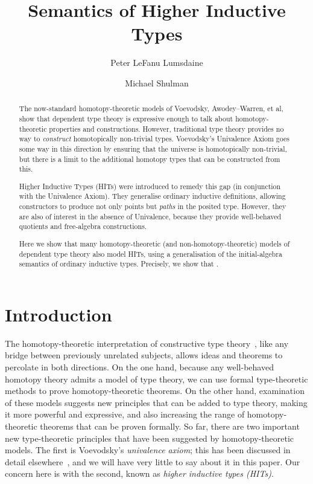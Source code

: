 \documentclass{amsart}
\title{Semantics of Higher Inductive Types}
\author{Peter LeFanu Lumsdaine}
\author{Michael Shulman}
\begin{document}
\maketitle

\begin{abstract}
The now-standard homotopy-theoretic models of Voevodsky, Awodey--Warren, et al, show that dependent type theory is expressive enough to talk about homotopy-theoretic properties and constructions.
%
However, traditional type theory provides no way to \emph{construct} homotopically non-trivial types.
Voevodsky's Univalence Axiom goes some way in this direction by ensuring that the universe is homotopically non-trivial, but there is a limit to the additional homotopy types that can be constructed from this.

Higher Inductive Types (HITs) were introduced to remedy this gap (in conjunction with the Univalence Axiom).
%
They generalise ordinary inductive definitions, allowing constructors to produce not only points but \emph{paths} in the posited type.
However, they are also of interest in the absence of Univalence, because they provide well-behaved quotients and free-algebra constructions.

Here we show that many homotopy-theoretic (and non-homotopy-theoretic) models of dependent type theory also model HITs, using a generalisation of the initial-algebra semantics of ordinary inductive types.
%
Precisely, we show that \todo{\ldots} .
\end{abstract}


\tableofcontents

\section{Introduction}

The homotopy-theoretic interpretation of constructive type theory~\cite{...}, like any bridge between previously unrelated subjects, allows ideas and theorems to percolate in both directions.
On the one hand, because any well-behaved homotopy theory admits a model of type theory, we can use formal type-theoretic methods to prove homotopy-theoretic theorems.
On the other hand, examination of these models suggests new principles that can be added to type theory, making it more powerful and expressive, and also increasing the range of homotopy-theoretic theorems that can be proven formally.
So far, there are two important new type-theoretic principles that have been suggested by homotopy-theoretic models.
The first is Voevodsky's \emph{univalence axiom}; this has been discussed in detail elsewhere~\cite{klv:ssetmodel}, and we will have very little to say about it in this paper.
Our concern here is with the second, known as \emph{higher inductive types (HITs)}.
\end{document}
